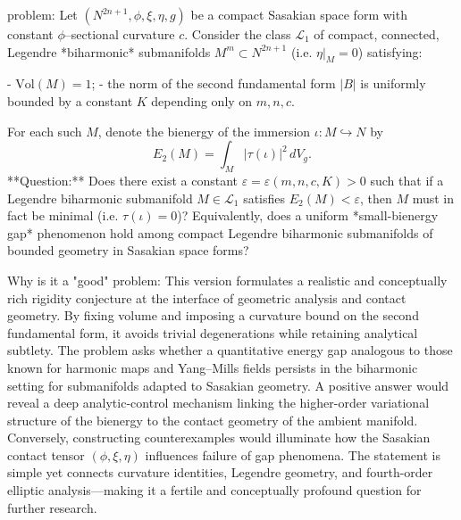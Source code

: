 problem:  
Let \((N^{2n+1}, \phi, \xi, \eta, g)\) be a compact Sasakian space form with constant \(\phi\)–sectional curvature \(c\).  
Consider the class \(\mathcal{L}_1\) of compact, connected, Legendre *biharmonic* submanifolds \(M^m \subset N^{2n+1}\) (i.e. \(\eta|_M = 0\)) satisfying:  

- \(\mathrm{Vol}(M) = 1\);  
- the norm of the second fundamental form \( |B| \) is uniformly bounded by a constant \(K\) depending only on \(m,n,c\).  

For each such \(M\), denote the bienergy of the immersion \(\iota: M \hookrightarrow N\) by  
\[
E_2(M) = \int_M |\tau(\iota)|^2\, dV_g.
\]  
**Question:**  
Does there exist a constant \(\varepsilon = \varepsilon(m,n,c,K) > 0\) such that if a Legendre biharmonic submanifold \(M \in \mathcal{L}_1\) satisfies \(E_2(M) < \varepsilon\), then \(M\) must in fact be minimal (i.e. \(\tau(\iota) = 0\))?  
Equivalently, does a uniform *small-bienergy gap* phenomenon hold among compact Legendre biharmonic submanifolds of bounded geometry in Sasakian space forms?

Why is it a "good" problem:  
This version formulates a realistic and conceptually rich rigidity conjecture at the interface of geometric analysis and contact geometry. By fixing volume and imposing a curvature bound on the second fundamental form, it avoids trivial degenerations while retaining analytical subtlety. The problem asks whether a quantitative energy gap analogous to those known for harmonic maps and Yang–Mills fields persists in the biharmonic setting for submanifolds adapted to Sasakian geometry. A positive answer would reveal a deep analytic-control mechanism linking the higher-order variational structure of the bienergy to the contact geometry of the ambient manifold. Conversely, constructing counterexamples would illuminate how the Sasakian contact tensor \((\phi,\xi,\eta)\) influences failure of gap phenomena. The statement is simple yet connects curvature identities, Legendre geometry, and fourth-order elliptic analysis—making it a fertile and conceptually profound question for further research.
